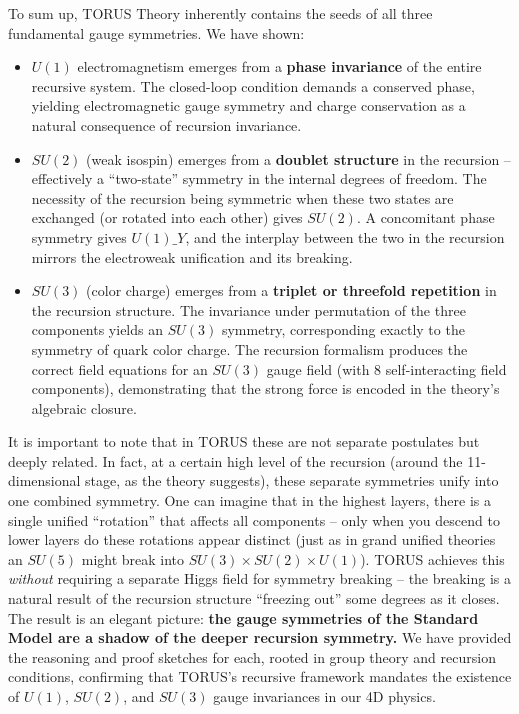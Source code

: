 \documentclass[]{article}
\begin{document}
To sum up, TORUS Theory inherently contains the seeds of all three
fundamental gauge symmetries. We have shown:

\begin{itemize}
\item
  $U(1)$ electromagnetism emerges from a \textbf{phase invariance} of
  the entire recursive system. The closed-loop condition demands a
  conserved phase, yielding electromagnetic gauge symmetry and charge
  conservation as a natural consequence of recursion invariance.
\item
  $SU(2)$ (weak isospin) emerges from a \textbf{doublet structure} in
  the recursion -- effectively a ``two-state'' symmetry in the internal
  degrees of freedom​. The necessity of the recursion being symmetric
  when these two states are exchanged (or rotated into each other) gives
  $SU(2)$. A concomitant phase symmetry gives $U(1)\_Y$, and the
  interplay between the two in the recursion mirrors the electroweak
  unification and its breaking​.
\item
  $SU(3)$ (color charge) emerges from a \textbf{triplet or threefold
  repetition} in the recursion structure​. The invariance under
  permutation of the three components yields an $SU(3)$ symmetry,
  corresponding exactly to the symmetry of quark color charge. The
  recursion formalism produces the correct field equations for an
  $SU(3)$ gauge field (with 8 self-interacting field components),
  demonstrating that the strong force is encoded in the theory's
  algebraic closure​.
\end{itemize}

It is important to note that in TORUS these are not separate postulates
but deeply related. In fact, at a certain high level of the recursion
(around the 11-dimensional stage, as the theory suggests), these
separate symmetries unify into one combined symmetry​. One can imagine
that in the highest layers, there is a single unified ``rotation'' that
affects all components -- only when you descend to lower layers do these
rotations appear distinct (just as in grand unified theories an
$SU(5)$ might break into $SU(3)\times
SU(2)\times U(1)$). TORUS achieves this \emph{without}
requiring a separate Higgs field for symmetry breaking -- the breaking
is a natural result of the recursion structure ``freezing out'' some
degrees as it closes​. The result is an elegant picture: \textbf{the
gauge symmetries of the Standard Model are a shadow of the deeper
recursion symmetry.} We have provided the reasoning and proof sketches
for each, rooted in group theory and recursion conditions, confirming
that TORUS's recursive framework mandates the existence of $U(1)$,
$SU(2)$, and $SU(3)$ gauge invariances in our 4D physics.
\end{document}
